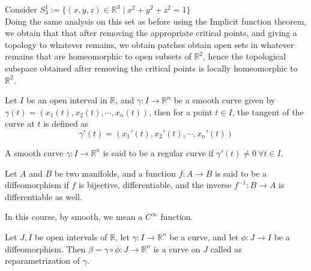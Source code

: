 \vspace{0.4cm}
\begin{eg}[]
    Consider $S_{3}^{1}:=\{(x,y,z)\in\mathbb{R}^{3}\mid x^2+y^2+z^2=1\}$\\ 
    Doing the same analysis on this set as before using the Implicit function theorem, we obtain that that after removing the appropriate critical points, and giving a topology to whatever remains, we obtain patches obtain open sets in whatever remains that are homeomorphic to open subsets of $\mathbb{R}^{2}$, hence the topological subspace obtained after removing the critical points is locally homeomorphic to $\mathbb{R}^{2}$.
\end{eg}
\vspace{0.4cm}
\begin{definition}
    Let $I$ be an open interval in $\mathbb{R}$, and $\gamma:I\to\mathbb{R}^{n}$ be a smooth curve given by $\gamma(t)=(x_{1}(t),x_{2}(t),\cdots,x_{n}(t))$, then for a point $t\in I$, the tangent of the curve at $t$ is defined as $$\gamma'(t)=(x_{1}'(t),x_{2}'(t),\cdots,x_{n}'(t))$$
\end{definition}
\vspace{0.4cm}
\begin{definition}
        A smooth curve $\gamma:I\to\mathbb{R}^{n}$ is said to be a regular curve if $\gamma'(t)\neq0~\forall t\in I$.
\end{definition}
\vspace{0.4cm}
\begin{definition}[Diffeomorphism]
    Let $A$ and $B$ be two manifolds, and a function $f:A\to B$ is said to be a diffeomorphism if $f$ is bijective, differentiable, and the inverse $f^{-1}:B\to A$ is differentiable as well.
\end{definition}
\vspace{0.4cm}
\begin{note}[]
    In this course, by smooth, we mean a $C^{\infty}$ function.
\end{note}
\vspace{0.4cm}
\begin{definition}
    Let $J, I$ be open intervals of $\mathbb{R}$, let $\gamma:I\to\mathbb{R}^{n}$ be a curve, and let $\phi:J\to I$ be a diffeomorphism. Then $\beta=\gamma\circ\phi:J\to\mathbb{R}^{n}$ is a curve on $J$ called as reparametrization of $\gamma$.
\end{definition}
\vspace{0.4cm}
